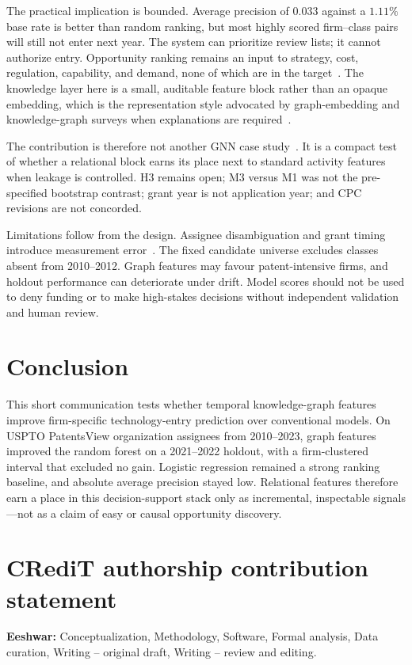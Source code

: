 \documentclass[preprint,12pt,3p]{elsarticle}
\begin{document}
The practical implication is bounded. Average precision of $0.033$ against a $1.11\%$ base rate is better than random ranking, but most highly scored firm--class pairs will still not enter next year. The system can prioritize review lists; it cannot authorize entry. Opportunity ranking remains an input to strategy, cost, regulation, capability, and demand, none of which are in the target~\cite{shi2019,feng2020}. The knowledge layer here is a small, auditable feature block rather than an opaque embedding, which is the representation style advocated by graph-embedding and knowledge-graph surveys when explanations are required~\cite{wang2017ieee,ji2022,nickel2016,cai2018,goyal2018}.

The contribution is therefore not another GNN case study~\cite{park2022,wu2026,liu2023techno}. It is a compact test of whether a relational block earns its place next to standard activity features when leakage is controlled. H3 remains open; M3 versus M1 was not the pre-specified bootstrap contrast; grant year is not application year; and CPC revisions are not concorded.

Limitations follow from the design. Assignee disambiguation and grant timing introduce measurement error~\cite{uspto2025,uspto2026}. The fixed candidate universe excludes classes absent from 2010--2012. Graph features may favour patent-intensive firms, and holdout performance can deteriorate under drift. Model scores should not be used to deny funding or to make high-stakes decisions without independent validation and human review.

\section{Conclusion}
\label{sec:conclusion}
This short communication tests whether temporal knowledge-graph features improve firm-specific technology-entry prediction over conventional models. On USPTO PatentsView organization assignees from 2010--2023, graph features improved the random forest on a 2021--2022 holdout, with a firm-clustered interval that excluded no gain. Logistic regression remained a strong ranking baseline, and absolute average precision stayed low. Relational features therefore earn a place in this decision-support stack only as incremental, inspectable signals---not as a claim of easy or causal opportunity discovery.

\section*{CRediT authorship contribution statement}
\textbf{Eeshwar:} Conceptualization, Methodology, Software, Formal analysis, Data curation, Writing -- original draft, Writing -- review and editing.
\end{document}
